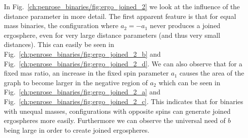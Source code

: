 In Fig.~\ref{ch:penrose_binaries/fig:ergo_joined_2} we look at the influence of the distance parameter in more detail. The first apparent feature is that for equal mass binaries, the configuration where $a_2=-a_1$ never produces a joined ergosphere, even for very large distance parameters (and thus very small distances). This can easily be seen in Fig.~\ref{ch:penrose_binaries/fig:ergo_joined_2_b} and Fig.~\ref{ch:penrose_binaries/fig:ergo_joined_2_d}. We can also observe that for a fixed mas ratio, an increase in the fixed spin parameter $a_1$ causes the area of the graph to become larger in the negative region of $a_2$ which can be seen in Fig.~\ref{ch:penrose_binaries/fig:ergo_joined_2_a} and Fig.~\ref{ch:penrose_binaries/fig:ergo_joined_2_c}. This indicates that for binaries with unequal masses, configurations with opposite spins can generate joined ergospheres more easily. Furthermore we can observe the universal need of $b$ being large in order to create joined ergospheres.

